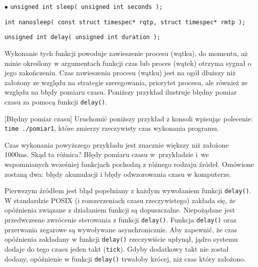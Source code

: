 \begin{myitemize}
\item[$\bullet$] \lstinline[style=MyCStyle]{unsigned int sleep( unsigned int seconds );}
\item[$\bullet$] \lstinline[style=MyCStyle]{int nanosleep( const struct timespec* rqtp, struct timespec* rmtp );}
\item[$\bullet$] \lstinline[style=MyCStyle]{unsigned int delay( unsigned int duration );}
\end{myitemize}

Wykonanie tych funkcji powoduje zawieszenie procesu (wątku), do momentu, aż minie określony w argumentach funkcji czas lub proces (wątek) otrzyma sygnał o jego zakończeniu. Czas zawieszenia procesu (wątku) jest na ogół dłuższy niż założony ze względu na strategie szeregowania, priorytet procesu, ale również ze względu na błędy pomiaru czasu. Poniższy przykład ilustruje błędny pomiar czasu za pomocą funkcji \lstinline[style=MyCStyle]{delay()}. 

\begin{example}{[Błędny pomiar czasu]} Uruchomić poniższy przykład z konsoli wpisując polecenie: \lstinline[style=MyCStyle]{time ./pomiar1}, które zmierzy rzeczywisty czas wykonania programu.

\end{example} 

Czas wykonania powyższego przykładu jest znacznie większy niż założone 1000ms. Skąd ta różnica? Błędy pomiaru czasu w~przykładzie i~we wspomnianych wcześniej funkcjach pochodzą z różnego rodzaju źródeł. Omówione zostaną dwa: błędy akumulacji i błędy odwzorowania czasu w komputerze. 

Pierwszym źródłem jest błąd popełniany z każdym wywołaniem funkcji \lstinline[style=MyCStyle]{delay()}. W standardzie POSIX (i rozszerzeniach czasu rzeczywistego) zakłada się, że opóźnienia związane z działaniem funkcji są dopuszczalne. Niepożądane jest przedwczesne zwrócenie sterowania z funkcji \lstinline[style=MyCStyle]{delay()}. Funkcja \lstinline[style=MyCStyle]{delay()} oraz przerwania zegarowe są wywoływane asynchronicznie. Aby zapewnić, że czas opóźnienia zakładany w funkcji \lstinline[style=MyCStyle]{delay()} rzeczywiście upłynął, jądro systemu dodaje do tego czasu jeden takt (\lstinline[style=MyCStyle]{tick}). Gdyby dodatkowy takt nie został dodany, opóźnienie w funkcji \lstinline[style=MyCStyle]{delay()} trwałoby krócej, niż czas który założono. 

